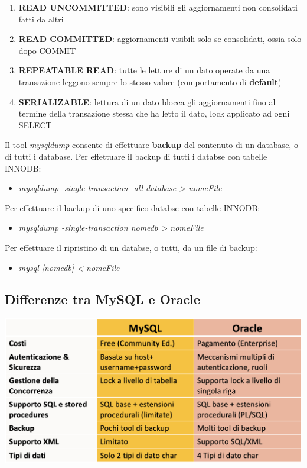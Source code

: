 \documentclass{article}
\begin{document}
\begin{enumerate}[label={-}, leftmargin=1cm]
    \item \textbf{READ UNCOMMITTED}: sono visibili gli aggiornamenti non consolidati fatti da altri
    \item \textbf{READ COMMITTED}: aggiornamenti visibili solo se consolidati, ossia solo dopo COMMIT
    \item \textbf{REPEATABLE READ}: tutte le letture di un dato operate da una transazione leggono sempre lo stesso valore (comportamento di \textbf{default})
    \item \textbf{SERIALIZABLE}: lettura di un dato blocca gli aggiornamenti fino al termine della transazione stessa che ha letto il dato, lock applicato ad ogni SELECT\vspace{14pt}\\
\end{enumerate}
Il tool \textit{mysqldump} consente di effettuare \textbf{backup} del contenuto di un database, o di tutti i database. Per effettuare il backup di tutti i databse con tabelle INNODB:
\begin{itemize}[label={ }, leftmargin=1cm]
    \item \textit{mysqldump -single-transaction -all-database > nomeFile}
\end{itemize}
Per effettuare il backup di uno specifico databse con tabelle INNODB:
\begin{itemize}[label={ }, leftmargin=1cm]
    \item \textit{mysqldump -single-transaction nomedb > nomeFile}
\end{itemize}
Per effettuare il ripristino di un databse, o tutti, da un file di backup:
\begin{itemize}[label={ }, leftmargin=1cm]
    \item \textit{mysql [nomedb] < nomeFile}
\end{itemize}

\subsection*{Differenze tra MySQL e Oracle}
\large
\begin{center}
    \includegraphics[width=1\textwidth]{foto 1.png}
\end{center}
\end{document}
